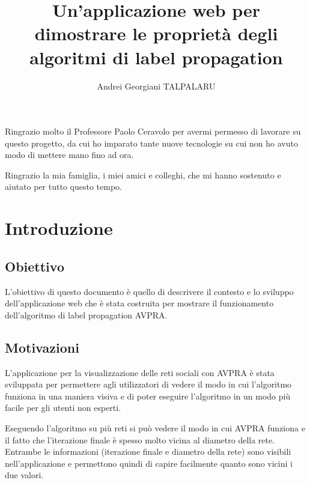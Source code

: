 \documentclass[a4paper,12pt]{report}
\begin{document}

\setcounter{secnumdepth}{5}
\setcounter{tocdepth}{5}

\title{Un'applicazione web per dimostrare le proprietà degli algoritmi di label propagation}
\author{Andrei Georgiani TALPALARU}

\beforepreface
{}
Ringrazio molto il Professore Paolo Ceravolo per avermi permesso di lavorare su questo progetto, da cui ho imparato tante nuove tecnologie su cui non ho avuto modo di mettere mano fino ad ora. 

Ringrazio la mia famiglia, i miei amici e colleghi, che mi hanno sostenuto e aiutato per tutto questo tempo.
\afterpreface
% 
% 
%		
\chapter{Introduzione}

\section{Obiettivo}
L'obiettivo di questo documento è quello di descrivere il contesto e lo sviluppo dell'applicazione web che è stata costruita per mostrare il funzionamento dell'algoritmo di label propagation AVPRA.

\section{Motivazioni}
L'applicazione per la visualizzazione delle reti sociali con AVPRA è stata sviluppata per permettere agli utilizzatori di vedere il modo in cui l'algoritmo funziona in una maniera visiva e di poter eseguire l'algoritmo in un modo più facile per gli utenti non esperti.

Eseguendo l'algoritmo su più reti si può vedere il modo in cui AVPRA funziona e il fatto che l'iterazione finale è spesso molto vicina al diametro della rete. Entrambe le informazioni (iterazione finale e diametro della rete) sono visibili nell'applicazione e permettono quindi di capire facilmente quanto sono vicini i due valori.

\pagebreak
\end{document}
